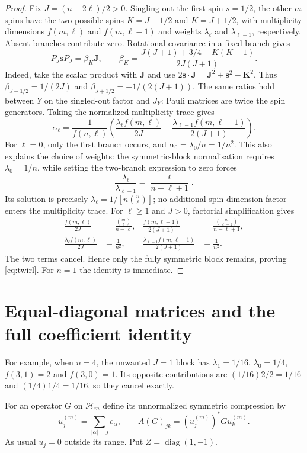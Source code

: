\documentclass[11pt,a4paper]{article}
\theoremstyle{remark}\newtheorem{remark}[theorem]{Remark}
\newcommand{\HH}{\mathcal H}
\newcommand{\bin}[2]{\binom{#1}{#2}}
\begin{document}
\begin{proof}
Fix $J=(n-2\ell)/2>0$. Singling out the first spin $s=1/2$, the other $m$ spins have the two possible spins $K=J-1/2$ and $K=J+1/2$, with multiplicity dimensions $f(m,\ell)$ and $f(m,\ell-1)$ and weights $\lambda_\ell$ and $\lambda_{\ell-1}$, respectively. Absent branches contribute zero. Rotational covariance in a fixed branch gives
\[
 P_J\mathbf sP_J=\beta_K\mathbf J,
 \qquad
 \beta_K=\frac{J(J+1)+3/4-K(K+1)}{2J(J+1)}.
\]
Indeed, take the scalar product with $\mathbf J$ and use
$2\mathbf s\cdot\mathbf J=\mathbf J^2+\mathbf s^2-\mathbf K^2$.
Thus $\beta_{J-1/2}=1/(2J)$ and $\beta_{J+1/2}=-1/(2(J+1))$. The same ratios hold between $Y$ on the singled-out factor and $J_Y$: Pauli matrices are twice the spin generators. Taking the normalized multiplicity trace gives
\begin{equation}\label{eq:alpha}
 \alpha_\ell=\frac1{f(n,\ell)}
 \left(\frac{\lambda_\ell f(m,\ell)}{2J}
       -\frac{\lambda_{\ell-1}f(m,\ell-1)}{2(J+1)}\right).
\end{equation}
For $\ell=0$, only the first branch occurs, and $\alpha_0=\lambda_0/n=1/n^2$.
This also explains the choice of weights: the symmetric-block normalisation requires $\lambda_0=1/n$, while setting the two-branch expression to zero forces
\[
 \frac{\lambda_\ell}{\lambda_{\ell-1}}
 =\frac{\ell}{n-\ell+1}.
\]
Its solution is precisely $\lambda_\ell=1/[n\bin n\ell]$; no additional spin-dimension factor enters the multiplicity trace.
For $\ell\geq1$ and $J>0$, factorial simplification gives
\begin{align*}
 \frac{f(m,\ell)}{2J}&=\frac{\bin m\ell}{n-\ell},&
 \frac{f(m,\ell-1)}{2(J+1)}&=\frac{\bin m{\ell-1}}{n-\ell+1},\\
 \frac{\lambda_\ell f(m,\ell)}{2J}&=\frac1{n^2},&
 \frac{\lambda_{\ell-1}f(m,\ell-1)}{2(J+1)}&=\frac1{n^2}.
\end{align*}
The two terms cancel. Hence only the fully symmetric block remains, proving \eqref{eq:twirl}. For $n=1$ the identity is immediate.
\end{proof}

\section{Equal-diagonal matrices and the full coefficient identity}
For example, when $n=4$, the unwanted $J=1$ block has $\lambda_1=1/16$, $\lambda_0=1/4$, $f(3,1)=2$ and $f(3,0)=1$. Its opposite contributions are $(1/16)2/2=1/16$ and $(1/4)1/4=1/16$, so they cancel exactly.

For an operator $G$ on $\HH_m$ define its unnormalized symmetric compression by
\[
 u_j^{(m)}=\sum_{|\alpha|=j}e_\alpha,
 \qquad A(G)_{jk}=(u_j^{(m)})^*G u_k^{(m)}.
\]
As usual $u_j=0$ outside its range. Put $Z=\operatorname{diag}(1,-1)$.
\end{document}
